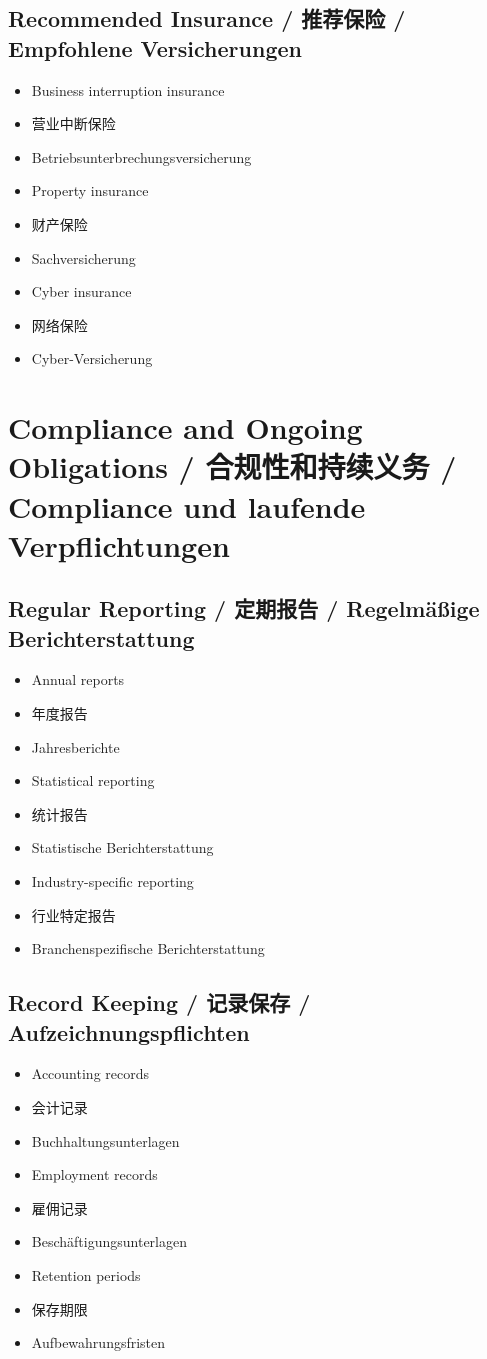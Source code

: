 \subsection{Recommended Insurance / 推荐保险 / Empfohlene Versicherungen}
\begin{itemize}
    \item Business interruption insurance
    \item 营业中断保险
    \item Betriebsunterbrechungsversicherung
    \item Property insurance
    \item 财产保险
    \item Sachversicherung
    \item Cyber insurance
    \item 网络保险
    \item Cyber-Versicherung
\end{itemize}

\section{Compliance and Ongoing Obligations / 合规性和持续义务 / Compliance und laufende Verpflichtungen}

\subsection{Regular Reporting / 定期报告 / Regelmäßige Berichterstattung}
\begin{itemize}
    \item Annual reports
    \item 年度报告
    \item Jahresberichte
    \item Statistical reporting
    \item 统计报告
    \item Statistische Berichterstattung
    \item Industry-specific reporting
    \item 行业特定报告
    \item Branchenspezifische Berichterstattung
\end{itemize}

\subsection{Record Keeping / 记录保存 / Aufzeichnungspflichten}
\begin{itemize}
    \item Accounting records
    \item 会计记录
    \item Buchhaltungsunterlagen
    \item Employment records
    \item 雇佣记录
    \item Beschäftigungsunterlagen
    \item Retention periods
    \item 保存期限
    \item Aufbewahrungsfristen
\end{itemize}

